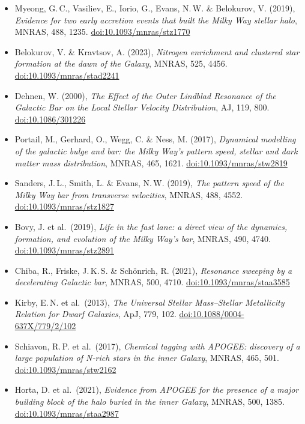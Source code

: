 \documentclass[11pt,a4paper]{article}
\begin{document}
{\begin{itemize}[leftmargin=1.2em,itemsep=0.1em,parsep=0pt,topsep=0.3em]
\item Myeong, G.\,C., Vasiliev, E., Iorio, G., Evans, N.\,W. \& Belokurov, V. (2019), \emph{Evidence for two early accretion events that built the Milky Way stellar halo}, MNRAS, 488, 1235. \href{https://doi.org/10.1093/mnras/stz1770}{doi:10.1093/mnras/stz1770}
\item Belokurov, V. \& Kravtsov, A. (2023), \emph{Nitrogen enrichment and clustered star formation at the dawn of the Galaxy}, MNRAS, 525, 4456. \href{https://doi.org/10.1093/mnras/stad2241}{doi:10.1093/mnras/stad2241}
\item Dehnen, W. (2000), \emph{The Effect of the Outer Lindblad Resonance of the Galactic Bar on the Local Stellar Velocity Distribution}, AJ, 119, 800. \href{https://doi.org/10.1086/301226}{doi:10.1086/301226}
\item Portail, M., Gerhard, O., Wegg, C. \& Ness, M. (2017), \emph{Dynamical modelling of the galactic bulge and bar: the Milky Way's pattern speed, stellar and dark matter mass distribution}, MNRAS, 465, 1621. \href{https://doi.org/10.1093/mnras/stw2819}{doi:10.1093/mnras/stw2819}
\item Sanders, J.\,L., Smith, L. \& Evans, N.\,W. (2019), \emph{The pattern speed of the Milky Way bar from transverse velocities}, MNRAS, 488, 4552. \href{https://doi.org/10.1093/mnras/stz1827}{doi:10.1093/mnras/stz1827}
\item Bovy, J. et al.\ (2019), \emph{Life in the fast lane: a direct view of the dynamics, formation, and evolution of the Milky Way's bar}, MNRAS, 490, 4740. \href{https://doi.org/10.1093/mnras/stz2891}{doi:10.1093/mnras/stz2891}
\item Chiba, R., Friske, J.\,K.\,S. \& Schönrich, R. (2021), \emph{Resonance sweeping by a decelerating Galactic bar}, MNRAS, 500, 4710. \href{https://doi.org/10.1093/mnras/staa3585}{doi:10.1093/mnras/staa3585}
\item Kirby, E.\,N. et al.\ (2013), \emph{The Universal Stellar Mass--Stellar Metallicity Relation for Dwarf Galaxies}, ApJ, 779, 102. \href{https://doi.org/10.1088/0004-637X/779/2/102}{doi:10.1088/0004-637X/779/2/102}
\item Schiavon, R.\,P. et al.\ (2017), \emph{Chemical tagging with APOGEE: discovery of a large population of N-rich stars in the inner Galaxy}, MNRAS, 465, 501. \href{https://doi.org/10.1093/mnras/stw2162}{doi:10.1093/mnras/stw2162}
\item Horta, D. et al.\ (2021), \emph{Evidence from APOGEE for the presence of a major building block of the halo buried in the inner Galaxy}, MNRAS, 500, 1385. \href{https://doi.org/10.1093/mnras/staa2987}{doi:10.1093/mnras/staa2987}

\end{itemize}}
\end{document}
